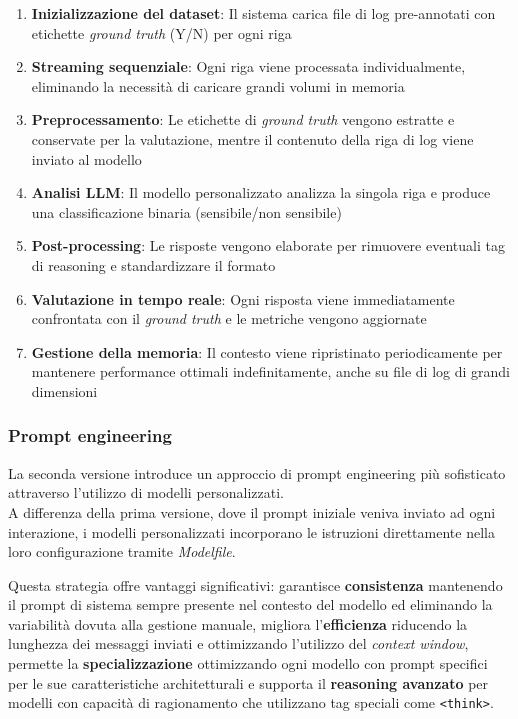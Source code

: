 \documentclass[12pt,twoside]{report}
\begin{document}
\begin{enumerate}
    \item \textbf{Inizializzazione del dataset}: Il sistema carica file di log pre-annotati con etichette \textit{ground truth} (Y/N) per ogni riga
    \item \textbf{Streaming sequenziale}: Ogni riga viene processata individualmente, eliminando la necessità di caricare grandi volumi in memoria
    \item \textbf{Preprocessamento}: Le etichette di \textit{ground truth} vengono estratte e conservate per la valutazione, mentre il contenuto della riga di log viene inviato al modello
    \item \textbf{Analisi LLM}: Il modello personalizzato analizza la singola riga e produce una classificazione binaria (sensibile/non sensibile)
    \item \textbf{Post-processing}: Le risposte vengono elaborate per rimuovere eventuali tag di reasoning e standardizzare il formato
    \item \textbf{Valutazione in tempo reale}: Ogni risposta viene immediatamente confrontata con il \textit{ground truth} e le metriche vengono aggiornate
    \item \textbf{Gestione della memoria}: Il contesto viene ripristinato periodicamente per mantenere performance ottimali indefinitamente, anche su file di log di grandi dimensioni
\end{enumerate}

\subsubsection{Prompt engineering}
\label{subsubsec:ver2_prompt_engineering}

La seconda versione introduce un approccio di prompt engineering più sofisticato attraverso l'utilizzo di modelli personalizzati.\\
A differenza della prima versione, dove il prompt iniziale veniva inviato ad ogni interazione, i modelli personalizzati incorporano le istruzioni direttamente nella loro configurazione tramite \textit{Modelfile}.

Questa strategia offre vantaggi significativi: garantisce \textbf{consistenza} mantenendo il prompt di sistema sempre presente nel contesto del modello ed eliminando la variabilità dovuta alla gestione manuale, migliora l'\textbf{efficienza} riducendo la lunghezza dei messaggi inviati e ottimizzando l'utilizzo del \textit{context window}, permette la \textbf{specializzazione} ottimizzando ogni modello con prompt specifici per le sue caratteristiche architetturali e supporta il \textbf{reasoning avanzato} per modelli con capacità di ragionamento che utilizzano tag speciali come \texttt{<think>}.
\end{document}
